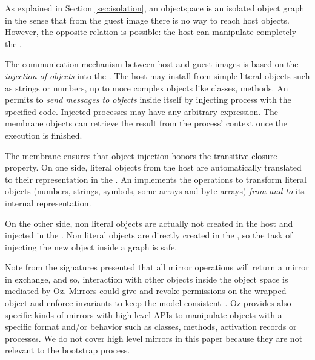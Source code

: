 As explained in Section \ref{sec:isolation}, an objectspace is an isolated object graph in the sense that from the guest image there is no way to reach host objects. However, the opposite relation is possible: the host can manipulate completely the \objectspace.

The communication mechanism between host and guest images is based on the \emph{injection of objects} into the \objectspace. The host may install from simple literal objects such as strings or numbers, up to more complex objects like classes, methods. An \objectspace permits to \emph{send messages to objects} inside itself by injecting process with the specified code. Injected processes may have any arbitrary expression. The membrane objects can retrieve the result from the process' context once the execution is finished.

The \objectspace membrane ensures that object injection honors the transitive closure property. On one side, literal objects from the host are automatically translated to their representation in the \objectspace. An \objectspace implements the operations to transform literal objects (numbers, strings, symbols, some arrays and byte arrays) \emph{from and to} its internal representation.

On the other side, non literal objects are actually not created in the host and injected in the \objectspace. Non literal objects are directly created in the \objectspace, so the task of injecting the new object inside a graph is safe.



Note from the signatures presented that all mirror operations will return a mirror in exchange, and so, interaction with other objects inside the object space is mediated by Oz. Mirrors could give and revoke permissions on the wrapped object and enforce invariants to keep the model consistent~\cite{Teru13a}.
Oz provides also specific kinds of mirrors with high level APIs to manipulate objects with a specific format and/or behavior such as classes, methods, activation records or processes. We do not cover high level mirrors in this paper because they are not relevant to the bootstrap process.


